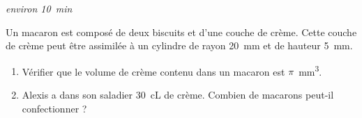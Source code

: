 \documentclass[main.tex]{subfiles}
\begin{document}
\newpage 
\begin{exercise}\label{chapter02:exercice:ap03}\hfill \emph{environ \SI{10}{\minute}}

Un macaron est composé de deux biscuits et d'une couche de crème. Cette
couche de crème peut être assimilée à un cylindre de rayon \SI{20}{\milli\meter} et de
hauteur \SI{5}{\milli\meter}. 

\begin{enumerate}[label=\alph*),leftmargin=*]
	\item Vérifier que le volume de crème contenu dans un macaron est $\pi$~\si{\milli\meter^3}. 
	\item Alexis a dans son saladier \SI{30}{\centi\liter} de crème.  	Combien de macarons peut-il confectionner ? 
\end{enumerate} 
\end{exercise}
%
\end{document}
